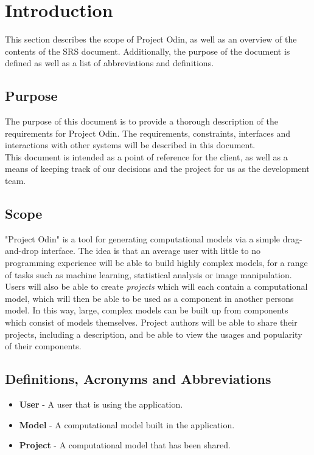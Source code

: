 \section{Introduction}
	This section describes the scope of Project Odin, as well as an overview of the contents of the SRS document. Additionally, the purpose of the document is defined as well as a list of abbreviations and definitions.
	\subsection{Purpose}
	The purpose of this document is to provide a thorough description of the requirements for Project Odin. The requirements, constraints, interfaces and interactions with other systems will be described in this document. \\
	This document is intended as a point of reference for the client, as well as a means of keeping track of our decisions and the project for us as the development team.
	\subsection{Scope}
	"Project Odin" is a tool for generating computational models via a simple drag-and-drop interface. The idea is that an average user with little to no programming experience will be able to build highly complex models, for a range of tasks such as machine learning, statistical analysis or image manipulation.\\
	Users will also be able to create \textit{projects} which will each contain a computational model, which will then be able to be used as a component in another persons model. In this way, large, complex models can be built up from components which consist of models themselves. Project authors will be able to share their projects, including a description, and be able to view the usages and popularity of their components.
	
	\subsection{Definitions, Acronyms and Abbreviations}
	\begin{itemize}
		\item \textbf{User} - A user that is using the application.
		\item \textbf{Model} - A computational model built in the application.
		\item \textbf{Project} - A computational model that has been shared.
	\end{itemize}
